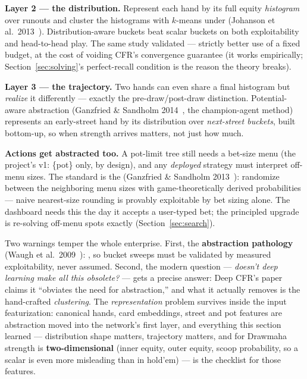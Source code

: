 \textbf{Layer 2 --- the distribution.} Represent each hand by its full equity \emph{histogram} over runouts and cluster the histograms with $k$-means under  (Johanson et al.\ 2013~\cite{johanson2013}). Distribution-aware buckets beat scalar buckets on both exploitability and head-to-head play. The same study validated  --- strictly better use of a fixed budget, at the cost of voiding CFR's convergence guarantee (it works empirically; Section~\ref{sec:solving}'s perfect-recall condition is the reason the theory breaks).

\textbf{Layer 3 --- the trajectory.} Two hands can even share a final histogram but \emph{realize} it differently --- exactly the pre-draw/post-draw distinction. Potential-aware abstraction (Ganzfried \& Sandholm 2014~\cite{ganzfried2014}, the champion-agent method) represents an early-street hand by its distribution over \emph{next-street buckets}, built bottom-up, so when strength arrives matters, not just how much. 

\textbf{Actions get abstracted too.} A pot-limit tree still needs a bet-size menu (the project's v1: \{pot\} only, by design), and any \emph{deployed} strategy must interpret off-menu sizes. The standard is the  (Ganzfried \& Sandholm 2013~\cite{ganzfried2013at}): randomize between the neighboring menu sizes with game-theoretically derived probabilities --- naive nearest-size rounding is provably exploitable by bet sizing alone. The dashboard needs this the day it accepts a user-typed bet; the principled upgrade is re-solving off-menu spots exactly (Section~\ref{sec:search}).

Two warnings temper the whole enterprise. First, the \textbf{abstraction pathology} (Waugh et al.\ 2009~\cite{waugh2009}): , so bucket sweeps must be validated by measured exploitability, never assumed. Second, the modern question --- \emph{doesn't deep learning make all this obsolete?} --- gets a precise answer: Deep CFR's paper claims it ``obviates the need for abstraction,'' and what it actually removes is the hand-crafted \emph{clustering}. The \emph{representation} problem survives inside the input featurization: canonical hands, card embeddings, street and pot features are abstraction moved into the network's first layer, and everything this section learned --- distribution shape matters, trajectory matters, and for Drawmaha strength is \textbf{two-dimensional} (inner equity, outer equity, scoop probability, so a scalar is even more misleading than in hold'em) --- is the checklist for those features.

